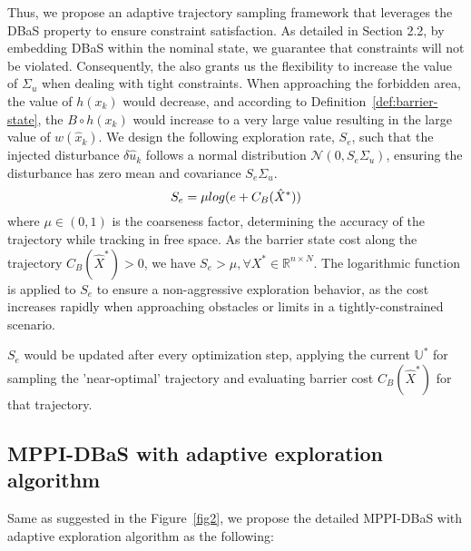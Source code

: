 \documentclass[english]{cccconf}
\begin{document}
Thus, we propose an adaptive trajectory sampling framework that leverages the DBaS property to ensure constraint satisfaction. As detailed in Section 2.2, by embedding DBaS within the nominal state, we guarantee that constraints will not be violated. Consequently, the also grants us the flexibility to increase the value of $\Sigma_u$ when dealing with tight constraints. When approaching the forbidden area, the value of $h(x_k)$ would decrease, and according to Definition~\ref{def:barrier-state}, the $B\circ h(x_k)$ would increase to a very large value resulting in the large value of $w(\hat{x}_k)$. We design the following exploration rate, $S_e$, such that the injected disturbance $\delta \hat{u}_k$ follows a normal distribution $\mathcal{N}(0, S_e\Sigma_u)$, ensuring the disturbance has zero mean and covariance $S_e\Sigma_u$.
\begin{equation}\label{eq:scaling factor}
    S_e = \mu \space log(e+ C_B(\hat{X}^*))
\end{equation}
where $\mu \in (0,1)$ is the coarseness factor, determining  the accuracy of the trajectory while tracking in free space. As the barrier state cost along the trajectory $ C_B(\hat{X}^*)>0$, we have $S_e>\mu, \forall X^*\in \mathbb{R}^{n \times N}$. The logarithmic function is applied to $S_e$ to ensure a non-aggressive exploration behavior, as the cost increases rapidly when approaching obstacles or limits in a tightly-constrained scenario.

$S_e$ would be updated after every optimization step, applying the current $\mathbb{U}^*$ for sampling the 'near-optimal' trajectory and evaluating barrier cost $ C_B(\hat{X}^*)$ for that trajectory.


\subsection{MPPI-DBaS with adaptive exploration algorithm}
Same as suggested in the Figure~\ref{fig2}, we propose the detailed MPPI-DBaS with adaptive exploration algorithm as the following:
\end{document}
